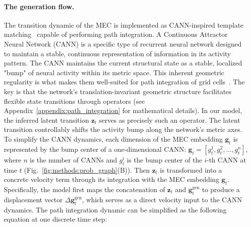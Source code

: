 \paragraph{The generation flow.}
The transition dynamic of the MEC is implemented as CANN-inspired template matching~\citep{wu2008dynamics, yoon2013specific} capable of performing path integration.
A Continuous Attractor Neural Network (CANN) is a specific type of recurrent neural network designed to maintain a stable, continuous representation of information in its activity pattern. 
The CANN maintains the current structural state as a stable, localized "bump" of neural activity within its metric space. 
This inherent geometric regularity is what makes them well-suited for path integration of grid cells~\citep{burak2009accurate, gardnerToroidalTopologyPopulation2022}.
The key is that the network's translation-invariant geometric structure facilitates flexible state transitions through operators (see Appendix~\ref{appendix:path_integration} for mathematical details). In our model, the inferred latent transition $\boldsymbol{z}_t$ serves as precisely such an operator. The latent transition controllably shifts the activity bump along the network's metric axes.
To simplify the CANN dynamics, each dimension of the MEC embedding $\boldsymbol{g}_t$ is represented by the bump center of a one-dimensional CANN: $\boldsymbol{g}_t = [g_{t}^1, g_{t}^2, \ldots, g_{t}^n]$, where $n$ is the number of CANNs and $g_{t}^i$ is the bump center of the $i$-th CANN at time $t$ (Fig.~\ref{fig:methods:prob_graph}(B)).
Then $\boldsymbol{z}_t$ is transformed into a concrete velocity term through its integration with the MEC embedding $\boldsymbol{g}_t$. Specifically, the model first maps the concatenation of $\boldsymbol{z}_t$ and $\boldsymbol{g}_{t}^{\text{gen}}$ to produce a displacement vector $\Delta \boldsymbol{g}_{t}^{\text{gen}}$, which serves as a direct velocity input to the CANN dynamics. The path integration dynamic can be simplified as the following equation at one discrete time step:
